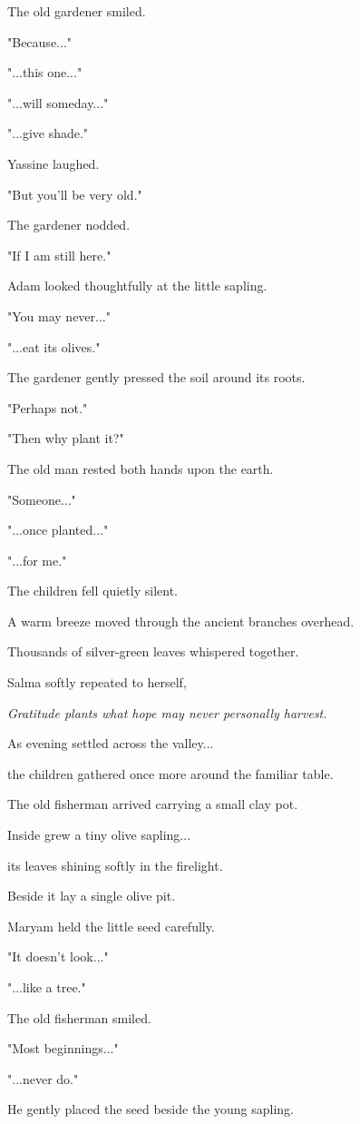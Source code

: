 \documentclass[12pt,openany]{book}
\begin{document}
The old gardener smiled.

"Because..."

"...this one..."

"...will someday..."

"...give shade."

Yassine laughed.

"But you'll be very old."

The gardener nodded.

"If I am still here."

Adam looked thoughtfully at the little sapling.

"You may never..."

"...eat its olives."

The gardener gently pressed the soil around its roots.

"Perhaps not."

"Then why plant it?"

The old man rested both hands upon the earth.

"Someone..."

"...once planted..."

"...for me."

The children fell quietly silent.

A warm breeze moved through the ancient branches overhead.

Thousands of silver-green leaves whispered together.

Salma softly repeated to herself,

\emph{Gratitude plants what hope may never personally harvest.}

As evening settled across the valley...

the children gathered once more around the familiar table.

The old fisherman arrived carrying a small clay pot.

Inside grew a tiny olive sapling...

its leaves shining softly in the firelight.

Beside it lay a single olive pit.

Maryam held the little seed carefully.

"It doesn't look..."

"...like a tree."

The old fisherman smiled.

"Most beginnings..."

"...never do."

He gently placed the seed beside the young sapling.
\end{document}
